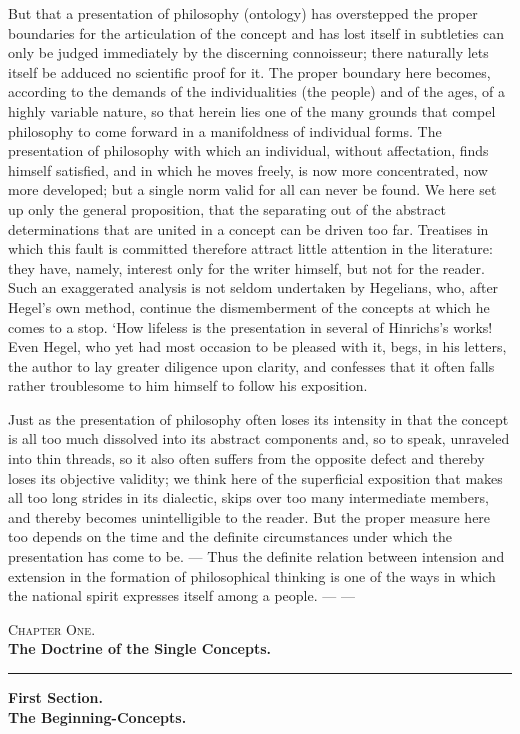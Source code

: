\documentclass[12pt]{article}
\newcommand{\opage}[1]{\marginnote{\footnotesize\textit{[#1]}}}
\begin{document}
But that a presentation of philosophy (ontology) has overstepped the proper
boundaries for the articulation of the concept and has \opage{205}lost itself in
subtleties can only be judged immediately by the discerning connoisseur; there
naturally lets itself be adduced no scientific proof for it. The proper boundary
here becomes, according to the demands of the individualities (the people) and of
the ages, of a highly variable nature, so that herein lies one of the many grounds
that compel philosophy to come forward in a manifoldness of individual forms. The
presentation of philosophy with which an individual, without affectation, finds
himself satisfied, and in which he moves freely, is now more concentrated, now more
developed; but a single norm valid for all can never be found. We here set up only
the general proposition, that the separating out of the abstract determinations
that are united in a concept can be driven too far. Treatises in which this fault
is committed therefore attract little attention in the literature: they have,
namely, interest only for the writer himself, but not for the reader. Such an
exaggerated analysis is not seldom undertaken by Hegelians, who, after Hegel's own
method, continue the dismemberment of the concepts at which he comes to a stop.
`How lifeless is the presentation in several of Hinrichs's works! Even Hegel, who
yet had most occasion to be pleased with it, begs, in his letters, the author to
lay greater diligence upon clarity, and confesses that it often falls rather
troublesome to him himself to follow his exposition.

Just as the presentation of philosophy often loses its intensity in that the
concept is all too much dissolved into its abstract components and, so to speak,
unraveled into thin threads, so it also often suffers from the opposite defect and
thereby loses its objective validity; we think here of the superficial exposition
that makes all too long strides in its dialectic, skips over too many intermediate
members, and thereby becomes unintelligible to the reader. But the proper measure
here too depends on the time and the definite circumstances under which the
presentation has come to be. --- Thus the definite \opage{206}relation between
intension and extension in the formation of philosophical thinking is one of the
ways in which the national spirit expresses itself among a people. --- ---

\bigskip
\begin{center}
{\large\scshape Chapter One.}\\[0.4em]
{\large\bfseries The Doctrine of the Single Concepts.}
\end{center}
\begin{center}\rule{0.25\textwidth}{0.4pt}\end{center}
\begin{center}
{\bfseries First Section.}\\[0.3em]
{\bfseries The Beginning-Concepts.}
\end{center}
\medskip
\end{document}
